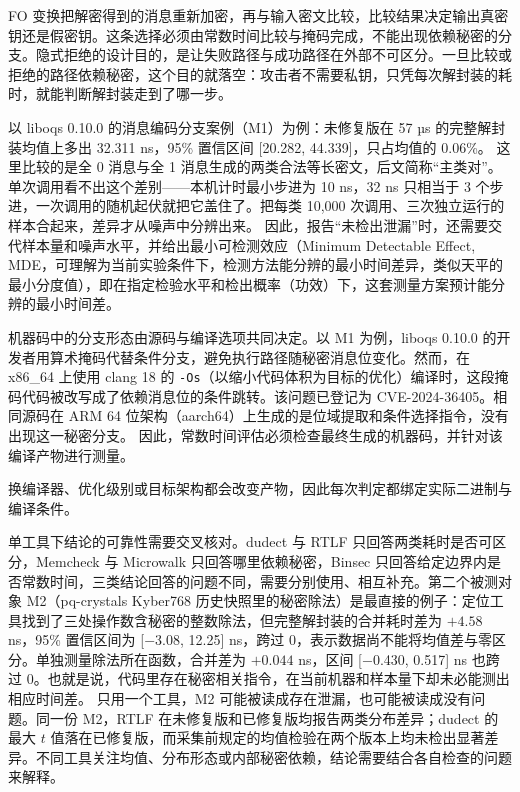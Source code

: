 FO 变换把解密得到的消息重新加密，再与输入密文比较，比较结果决定输出真密钥还是假密钥。这条选择必须由常数时间比较与掩码完成，不能出现依赖秘密的分支。隐式拒绝的设计目的，是让失败路径与成功路径在外部不可区分。一旦比较或拒绝的路径依赖秘密，这个目的就落空：攻击者不需要私钥，只凭每次解封装的耗时，就能判断解封装走到了哪一步。

以 liboqs 0.10.0 的消息编码分支案例（M1）为例：未修复版在 57 µs 的完整解封装均值上多出 32.311 ns，95\% 置信区间 [20.282, 44.339]，只占均值的 0.06\%。%
这里比较的是全 0 消息与全 1 消息生成的两类合法等长密文，后文简称“主类对”。单次调用看不出这个差别——本机计时最小步进为 10 ns，32 ns 只相当于 3 个步进，一次调用的随机起伏就把它盖住了。把每类 10,000 次调用、三次独立运行的样本合起来，差异才从噪声中分辨出来。%
因此，报告“未检出泄漏”时，还需要交代样本量和噪声水平，并给出最小可检测效应（Minimum Detectable Effect, MDE，可理解为当前实验条件下，检测方法能分辨的最小时间差异，类似天平的最小分度值），即在指定检验水平和检出概率（功效）下，这套测量方案预计能分辨的最小时间差。

机器码中的分支形态由源码与编译选项共同决定。以 M1 为例，liboqs 0.10.0 的开发者用算术掩码代替条件分支，避免执行路径随秘密消息位变化。然而，在 x86\_64 上使用 clang 18 的 \texttt{-Os}（以缩小代码体积为目标的优化）编译时，这段掩码代码被改写成了依赖消息位的条件跳转。该问题已登记为 CVE-2024-36405\cite{ghsa-f2v9}。相同源码在 ARM 64 位架构（aarch64）上生成的是位域提取和条件选择指令，没有出现这一秘密分支。%
因此，常数时间评估必须检查最终生成的机器码，并针对该编译产物进行测量。

换编译器、优化级别或目标架构都会改变产物，因此每次判定都绑定实际二进制与编译条件。

单工具下结论的可靠性需要交叉核对。dudect 与 RTLF 只回答两类耗时是否可区分\cite{dudect,rtlf}，Memcheck 与 Microwalk 只回答哪里依赖秘密\cite{ctgrind,microwalk}，Binsec 只回答给定边界内是否常数时间\cite{binsec}，三类结论回答的问题不同，需要分别使用、相互补充。第二个被测对象 M2（pq-crystals Kyber768 历史快照里的秘密除法）是最直接的例子：定位工具找到了三处操作数含秘密的整数除法，但完整解封装的合并耗时差为 $+4.58$ ns，95\% 置信区间为 [$-$3.08, 12.25] ns，跨过 0，表示数据尚不能将均值差与零区分。单独测量除法所在函数，合并差为 $+0.044$ ns，区间 [$-$0.430, 0.517] ns 也跨过 0。也就是说，代码里存在秘密相关指令，在当前机器和样本量下却未必能测出相应时间差。%
只用一个工具，M2 可能被读成存在泄漏，也可能被读成没有问题。同一份 M2，RTLF 在未修复版和已修复版均报告两类分布差异；dudect 的最大 $t$ 值落在已修复版，而采集前规定的均值检验在两个版本上均未检出显著差异。不同工具关注均值、分布形态或内部秘密依赖，结论需要结合各自检查的问题来解释。

